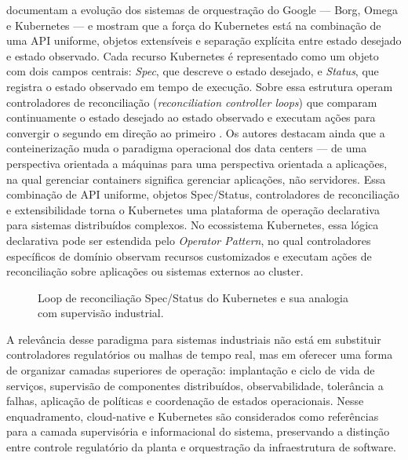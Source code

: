  documentam a evolução dos sistemas de orquestração do Google --- Borg, Omega e Kubernetes --- e mostram que a força do Kubernetes está na combinação de uma API uniforme, objetos extensíveis e separação explícita entre estado desejado e estado observado. Cada recurso Kubernetes é representado como um objeto com dois campos centrais: \textit{Spec}, que descreve o estado desejado, e \textit{Status}, que registra o estado observado em tempo de execução. Sobre essa estrutura operam controladores de reconciliação (\textit{reconciliation controller loops}) que comparam continuamente o estado desejado ao estado observado e executam ações para convergir o segundo em direção ao primeiro \cite{Burns2016}. Os autores destacam ainda que a conteinerização muda o paradigma operacional dos data centers --- de uma perspectiva orientada a máquinas para uma perspectiva orientada a aplicações, na qual gerenciar containers significa gerenciar aplicações, não servidores. Essa combinação de API uniforme, objetos Spec/Status, controladores de reconciliação e extensibilidade torna o Kubernetes uma plataforma de operação declarativa para sistemas distribuídos complexos. No ecossistema Kubernetes, essa lógica declarativa pode ser estendida pelo \textit{Operator Pattern}, no qual controladores específicos de domínio observam recursos customizados e executam ações de reconciliação sobre aplicações ou sistemas externos ao cluster.

\begin{figure}[htbp]
	\centering
	\caption{Loop de reconciliação Spec/Status do Kubernetes e sua analogia com supervisão industrial.}
	\label{fig:k8s_reconciliation}
\end{figure}

A relevância desse paradigma para sistemas industriais não está em substituir controladores regulatórios ou malhas de tempo real, mas em oferecer uma forma de organizar camadas superiores de operação: implantação e ciclo de vida de serviços, supervisão de componentes distribuídos, observabilidade, tolerância a falhas, aplicação de políticas e coordenação de estados operacionais. Nesse enquadramento, cloud-native e Kubernetes são considerados como referências para a camada supervisória e informacional do sistema, preservando a distinção entre controle regulatório da planta e orquestração da infraestrutura de software.


